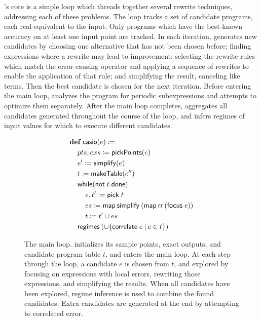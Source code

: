 \documentclass[paper.tex]{subfiles}
\begin{document}
\casio's core is a simple loop
  which threads together several rewrite techniques,
  addressing each of these problems.
The loop tracks a set of candidate programs,
  each real-equivalent to the input.
Only programs which have the best-known accuracy
  on at least one input point are tracked.
In each iteration, \casio generates new candidates
  by choosing one alternative that has not been chosen before;
  finding expressions where a rewrite may lead to improvement;
  selecting the rewrite-rules which match the error-causing operator
  and applying a sequence of rewrites to enable the application of that rule;
  and simplifying the result, canceling like terms.
Then the best candidate is chosen for the next iteration.
Before entering the main loop,
  \casio analyzes the program for periodic subexpressions
  and attempts to optimize them separately.
After the main loop completes,
  \casio aggregates all candidates generated
  throughout the course of the loop,
  and infers regimes of input values for which
  to execute different candidates.

\begin{figure}
\begin{footnotesize}
\begin{align*}
  &\!def!\:\|casio|(e) \ceq \\
  &\> pts, exs \ceq \|pickPoints|(e) \\
  &\> e' \ceq \|simplify|(e) \\
  &\> t \ceq \|makeTable|(e'') \\
  &\> \|while|(\|not| \; t.\|done|) \\
  &\> \> e, t' \ceq \|pick|\;t \\
  &\> \> es \ceq \|map|\:\|simplify|\:(\|map|\:\|rr|\:(\|focus|\;e)) \\
  &\> \> t \ceq t' \cup es \\
  &\> \|regimes|\:(\cup\{\|correlate|\;e \I e \in t \})
\end{align*}
\end{footnotesize}
\caption{The \casio main loop.
  \casio initializes its sample points, exact outputs,
    and candidate program table $t$, and enters the main loop.
  At each step through the loop, a candidate $e$ is chosen from $t$,
    and explored by focusing on expressions with local errors,
    rewriting those expressions, and simplifying the results.
  When all candidates have been explored,
    regime inference is used to combine the found candidates.
  Extra candidates are generated at the end by attempting to correlated error.}
\label{alg:main}
\end{figure}
\end{document}
